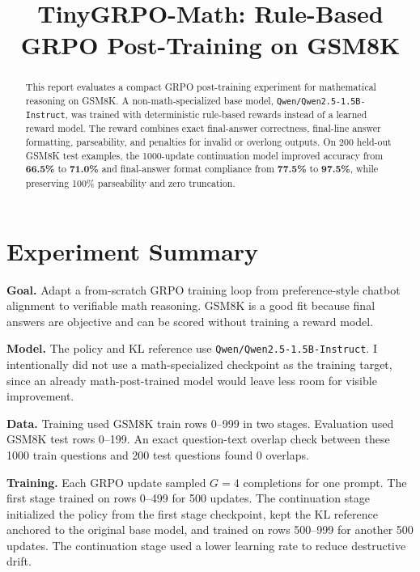 \documentclass[11pt]{article}
\title{\vspace{-1.0cm}\textbf{TinyGRPO-Math: Rule-Based GRPO Post-Training on GSM8K}}
\date{}
\begin{document}
\maketitle
\vspace{-0.5cm}

\begin{abstract}
This report evaluates a compact GRPO post-training experiment for mathematical reasoning on GSM8K. A non-math-specialized base model, \texttt{Qwen/Qwen2.5-1.5B-Instruct}, was trained with deterministic rule-based rewards instead of a learned reward model. The reward combines exact final-answer correctness, final-line answer formatting, parseability, and penalties for invalid or overlong outputs. On 200 held-out GSM8K test examples, the 1000-update continuation model improved accuracy from \textbf{66.5\%} to \textbf{71.0\%} and final-answer format compliance from \textbf{77.5\%} to \textbf{97.5\%}, while preserving 100\% parseability and zero truncation.
\end{abstract}

\section{Experiment Summary}

\textbf{Goal.} Adapt a from-scratch GRPO training loop from preference-style chatbot alignment to verifiable math reasoning. GSM8K is a good fit because final answers are objective and can be scored without training a reward model.

\textbf{Model.} The policy and KL reference use \texttt{Qwen/Qwen2.5-1.5B-Instruct}. I intentionally did not use a math-specialized checkpoint as the training target, since an already math-post-trained model would leave less room for visible improvement.

\textbf{Data.} Training used GSM8K train rows 0--999 in two stages. Evaluation used GSM8K test rows 0--199. An exact question-text overlap check between these 1000 train questions and 200 test questions found 0 overlaps.

\textbf{Training.} Each GRPO update sampled \(G=4\) completions for one prompt. The first stage trained on rows 0--499 for 500 updates. The continuation stage initialized the policy from the first stage checkpoint, kept the KL reference anchored to the original base model, and trained on rows 500--999 for another 500 updates. The continuation stage used a lower learning rate to reduce destructive drift.
\end{document}
